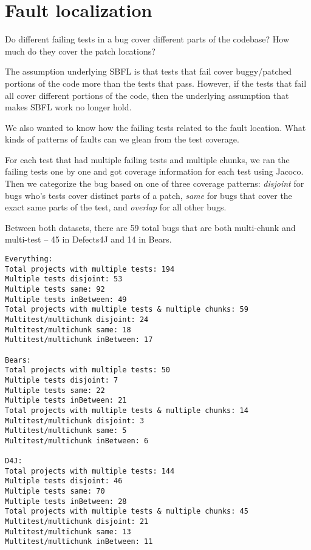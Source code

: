 \section{Fault localization}


Do different failing tests in a bug cover different parts of the codebase? How much do they cover the patch locations?

The assumption underlying SBFL is that tests that fail cover buggy/patched portions of the code more than the tests that pass. However, if the tests that fail all cover different portions of the code, then the underlying assumption that makes SBFL work no longer hold.

We also wanted to know how the failing tests related to the fault location. What kinds of patterns of faults can we glean from the test coverage.

For each test that had multiple failing tests and multiple chunks, we ran the failing tests one by one and got coverage information for each test using Jacoco. Then we categorize the bug based on one of three coverage patterns: \textit{disjoint} for bugs who's tests cover distinct parts of a patch, \textit{same} for bugs that cover the exact same parts of the test, and \textit{overlap} for all other bugs.

Between both datasets, there are 59 total bugs that are both multi-chunk and multi-test -- 45 in Defects4J and 14 in Bears.

\begin{lstlisting}
Everything:
Total projects with multiple tests: 194
Multiple tests disjoint: 53
Multiple tests same: 92
Multiple tests inBetween: 49
Total projects with multiple tests & multiple chunks: 59
Multitest/multichunk disjoint: 24
Multitest/multichunk same: 18
Multitest/multichunk inBetween: 17

Bears:
Total projects with multiple tests: 50
Multiple tests disjoint: 7
Multiple tests same: 22
Multiple tests inBetween: 21
Total projects with multiple tests & multiple chunks: 14
Multitest/multichunk disjoint: 3
Multitest/multichunk same: 5
Multitest/multichunk inBetween: 6

D4J:
Total projects with multiple tests: 144
Multiple tests disjoint: 46
Multiple tests same: 70
Multiple tests inBetween: 28
Total projects with multiple tests & multiple chunks: 45
Multitest/multichunk disjoint: 21
Multitest/multichunk same: 13
Multitest/multichunk inBetween: 11
\end{lstlisting}

